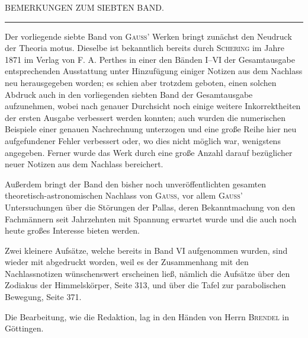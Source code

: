 \clearpage
\begingroup
{}
\renewcommand{\headrulewidth}{0pt}
\begin{center}\large BEMERKUNGEN ZUM SIEBTEN BAND.\end{center}
\begin{center}\rule{.09\linewidth}{.4pt}\end{center}

\par\noindent\hspace*{\parindent}Der vorliegende siebte Band von \textsc{Gauss}’ Werken bringt zunächst den Neudruck der Theoria motus.
Dieselbe ist bekanntlich bereits durch \textsc{Schering} im Jahre 1871 im Verlag von F. A. Perthes in einer den
Bänden I--VI der Gesamtausgabe entsprechenden Ausstattung unter Hinzufügung einiger Notizen aus dem
Nachlass neu herausgegeben worden; es schien aber trotzdem geboten, einen solchen Abdruck auch in den
vorliegenden siebten Band der Gesamtausgabe aufzunehmen, wobei nach genauer Durchsicht noch einige
weitere Inkorrektheiten der ersten Ausgabe verbessert werden konnten; auch wurden die numerischen Beispiele
einer genauen Nachrechnung unterzogen und eine große Reihe hier neu aufgefundener Fehler verbessert
oder, wo dies nicht möglich war, wenigstens angegeben. Ferner wurde das Werk durch eine
große Anzahl darauf bezüglicher neuer Notizen aus dem Nachlass bereichert.

\par\noindent\hspace*{\parindent}Außerdem bringt der Band den bisher noch unveröffentlichten gesamten theoretisch-astronomischen
Nachlass von \textsc{Gauss}, vor allem \textsc{Gauss}’ Untersuchungen über die Störungen der Pallas, deren Bekanntmachung
von den Fachmännern seit Jahrzehnten mit Spannung erwartet wurde und die auch noch heute
großes Interesse bieten werden.

\par\noindent\hspace*{\parindent}Zwei kleinere Aufsätze, welche bereits in Band VI aufgenommen wurden, sind wieder mit abgedruckt
worden, weil es der Zusammenhang mit den Nachlassnotizen wünschenswert erscheinen ließ, nämlich die
Aufsätze über den Zodiakus der Himmelskörper, Seite 313, und über die Tafel zur parabolischen Bewegung,
Seite 371.

\par\noindent\hspace*{\parindent}Die Bearbeitung, wie die Redaktion, lag in den Händen von Herrn \textsc{Brendel} in Göttingen.

